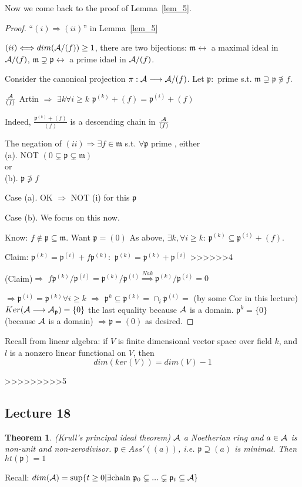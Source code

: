 \documentclass[11pt]{article}
\newtheorem{thm}{Theorem}[section]
\newcommand{\scm}{{\mathfrak m}}
\newcommand{\scp}{{\mathfrak p}}
\newcommand{\cala}{{\cal A}}
\newcommand{\Lrta}{\Longrightarrow}
\newcommand{\lrta}{\longrightarrow}
\newcommand{\llrta}{\longleftrightarrow}
\newcommand{\Llrta}{\Longleftrightarrow}
\begin{document}
Now we come back to the proof of Lemma~\ref{lem_5}.
\begin{proof}
``$(i)\Lrta(ii)$'' in Lemma~\ref{lem_5}

$(ii)\Llrta dim(\cala/(f))\geq 1$, there are two bijections: $\scm\llrta$ a maximal ideal in $\cala/(f)$, $\scm\supsetneq\scp\llrta$ a prime idael in $\cala/(f)$.

Consider the canonical projection $\pi:\cala\lrta \cala/(f)$. Let $\scp:$ prime s.t. $\scm\supsetneq \scp\not \ni f$.

$\frac{\cala}{(f)}$ Artin $\Lrta$ $\exists k\forall i\geq k$ $\scp^{(k)}+(f)=\scp^{(i)}+(f)$

Indeed, $\frac{\scp^{(k)}+(f)}{(f)}$ is a descending chain in $\frac{\cala}{(f)}$

The negation of $(ii)\Lrta\exists f\in \scm$ s.t. $\forall \scp$ prime , either\\
(a). NOT $(0\subsetneq \scp\subsetneq\scm)$\\
or\\
(b). $\scp\not\ni f$

Case (a). OK $\Lrta $ NOT (i) for this $\scp$

Case (b). We focus on this now.

Know: $f\notin \scp\subseteq \scm$. Want $\scp=(0)$ As above, $\exists k,\forall i\geq k$: $\scp^{(k)}\subseteq\scp^{(i)}+(f)$.

Claim: $\scp^{(k)}=\scp^{(i)}+f\scp^{(k)}:$
$\scp^{(k)}=\scp^{(k)}+\scp^{(i)}$
>>>>>>4

(Claim)$\Lrta$ $f\scp^{(k)}/\scp^{(i)}=\scp^{(k)}/\scp^{(i)}\overset{Nak}{\Lrta} \scp^{(k)}/\scp^{(i)}=0$

$\Lrta\scp^{(i)}=\scp^{(k)}\forall i\geq k$ $\Lrta$ $\scp^k\subseteq \scp^{(k)}=\cap_i\scp^{(i)}=$ (by some Cor in this lecture) $Ker(\cala\lrta \cala_\scp)=\{0\}$ the last equality because $\cala$ is a domain.
$\scp^k=\{0\}$ (because $\cala$ is a domain) $\Lrta\scp=(0)$ as desired.
\end{proof}
Recall from linear algebra:
if $V$ is finite dimensional vector space over field $k$, and $l$ is a nonzero linear functional on $V$, then
$$
dim(ker(V))=dim(V)-1
$$

>>>>>>>>>5


\subsection{Lecture 18}
\begin{thm}\label{thm:krull_principal}
(Krull's principal ideal theorem) $\cala$ a Noetherian ring and $a\in \cala$ is non-unit and non-zerodivisor.
$\scp\in Ass'((a))$, i.e. $\scp\supseteq (a)$ is minimal. Then $ht(\scp)=1$
\end{thm}
Recall: $dim(\cala)=\sup\{t\geq 0|\exists \text{chain } \scp_0\subsetneq...\subsetneq \scp_t\subseteq \cala\}$
\end{document}
